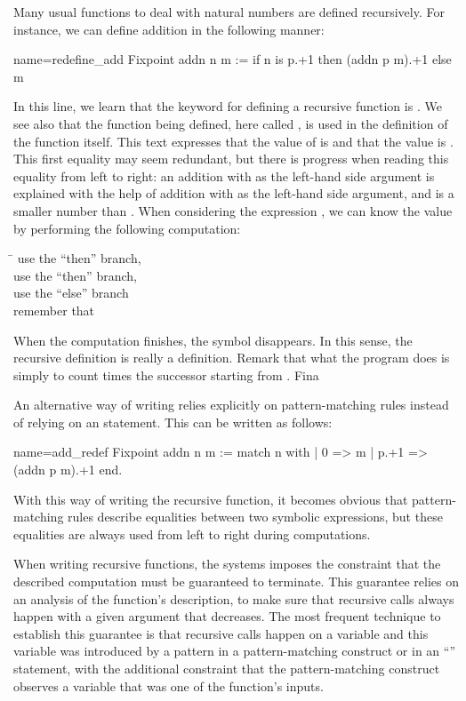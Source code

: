 Many usual functions to deal with natural numbers are
defined recursively.  For instance, we can define addition in the
following manner:

\begin{coq}{name=redefine_add}{}
Fixpoint addn n m :=
  if n is p.+1 then (addn p m).+1 else m
\end{coq}
In this line, we learn that the keyword for defining a recursive
function is .  We see also that the function being
defined, here called , is used in the definition of the
function  itself.  This text expresses that the value of
 is
 and that the value  is .
This first equality may
seem redundant, but there is progress when reading this equality from
left to right: an addition with  as the left-hand side argument
is explained with the help of addition with  as the left-hand side
argument, and  is a smaller number than .  When considering the
expression , we can know the value by performing the following
computation:
\begin{tabbing}
\=\kill
{} \> use the ``then'' branch, \\
 \> use the ``then'' branch, \\
 \> use the ``else'' branch\\
\> remember that 
\end{tabbing}
When the computation finishes, the symbol  disappears.  In
this sense, the recursive definition is really a definition.  Remark that
what the  program does is simply to count  times the
successor starting from .  Fina

An alternative way of writing  relies explicitly on
pattern-matching rules instead of relying on an  statement.
This can be written as follows:

\begin{coq}{name=add_redef}{}
Fixpoint addn n m :=
  match n with
  | 0 => m
  | p.+1 => (addn p m).+1
  end.
\end{coq}
With this way of writing the recursive function, it becomes obvious that
pattern-matching rules describe equalities between two symbolic
expressions, but these equalities are always used from left to right during
computations.

When writing recursive functions, the \Coq{} systems imposes the
constraint that the described computation must be guaranteed to
terminate.  This guarantee relies on an analysis of the function's
description, to make sure that recursive calls always happen with a
given argument that decreases.  The most frequent technique to
establish this guarantee is that recursive calls happen on a variable
and this variable was introduced by a pattern in a pattern-matching
construct or in an ``'' statement, with the additional
constraint that the pattern-matching construct observes a variable
that was one of the function's inputs.


